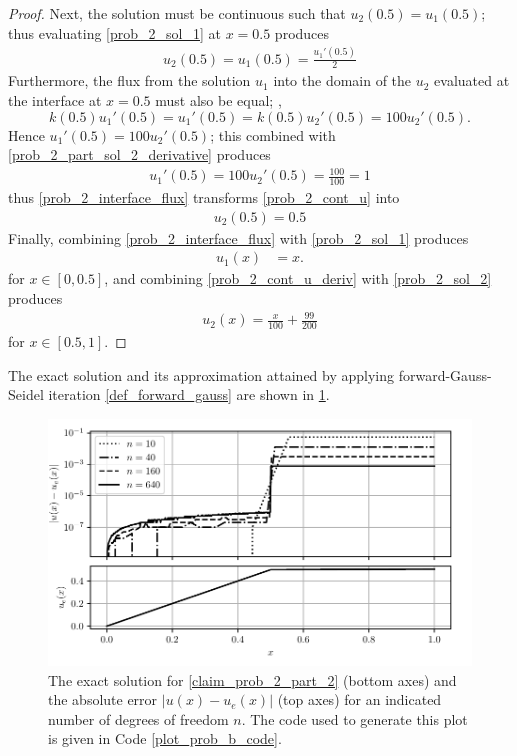 \documentclass[12pt]{evanarticle}
\begin{document}
\begin{proof}
Next, the solution must be continuous such that $u_2(0.5) = u_1(0.5)$; thus evaluating \cref{prob_2_sol_1} at $x = 0.5$ produces
\begin{align}
	\label{prob_2_cont_u}
	u_2(0.5)
	= u_1(0.5)
	= \frac{u_1'(0.5)}{2}
\end{align}
Furthermore, the flux from the solution $u_1$ into the domain of the $u_2$ evaluated at the interface at $x = 0.5$ must also be equal; \ie,
\[ k(0.5) u_1'(0.5) = u_1'(0.5) = k(0.5) u_2'(0.5) = 100 u_2'(0.5). \]
Hence $u_1'(0.5) = 100 u_2'(0.5)$; this combined with \cref{prob_2_part_sol_2_derivative} produces
\begin{align}
	\label{prob_2_interface_flux}
	u_1'(0.5) = 100 u_2'(0.5) = \frac{100}{100} = 1
\end{align}
thus \cref{prob_2_interface_flux} transforms \cref{prob_2_cont_u} into
\begin{align}
	\label{prob_2_cont_u_deriv}
	u_2(0.5)
	= 0.5
\end{align}
Finally, combining \cref{prob_2_interface_flux} with \cref{prob_2_sol_1} produces
\begin{align}
	\label{prob_2_gen_sol_1}
	u_1(x) &= x.
\end{align}
for $x \in [0,0.5]$, and combining \cref{prob_2_cont_u_deriv} with \cref{prob_2_sol_2} produces
\begin{align}
	\label{prob_2_gen_sol_2}
	u_2(x) = \frac{x}{100} + \frac{99}{200}
\end{align}
for $x \in [0.5, 1]$.
\end{proof}

The exact solution and its approximation attained by applying forward-Gauss-Seidel iteration \cref{def_forward_gauss} are shown in \cref{fig_prob_2_part_b}.

\begin{figure}
	\centering
		\includegraphics[width=1.0\linewidth]{../images/prob_2_part_b.pdf}
	\caption{The exact solution for \cref{claim_prob_2_part_2} (bottom axes) and the absolute error $| u(x) - u_e(x) |$ (top axes) for an indicated number of degrees of freedom $n$.
	The code used to generate this plot is given in Code \cref{plot_prob_b_code}.}
	\label{fig_prob_2_part_b}
\end{figure}
\end{document}
